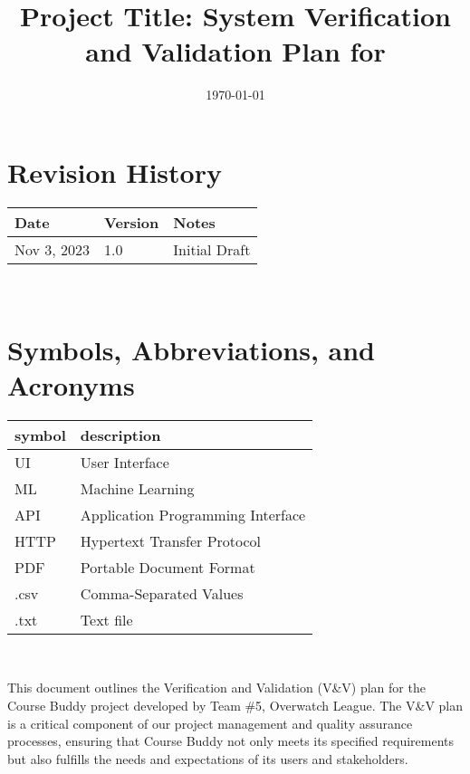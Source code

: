 \documentclass[12pt, titlepage]{article}
\begin{document}
\title{Project Title: System Verification and Validation Plan for \progname{}} 
\author{\authname}
\date{\today}
	
\maketitle


\section*{Revision History}

\begin{tabularx}{\textwidth}{p{3cm}p{2cm}X}
\toprule {\bf Date} & {\bf Version} & {\bf Notes}\\
\midrule
Nov 3, 2023 & 1.0 & Initial Draft\\
\bottomrule
\end{tabularx}

~\\
\newpage

\tableofcontents

\listoftables

\newpage

\section{Symbols, Abbreviations, and Acronyms}

\renewcommand{\arraystretch}{1.2}
\begin{tabular}{l l} 
  \toprule		
  \textbf{symbol} & \textbf{description}\\
  \midrule 
      UI & User Interface \\
      ML & Machine Learning\\
      API & Application Programming Interface\\
      HTTP & Hypertext Transfer Protocol\\
      PDF & Portable Document Format\\
      .csv & Comma-Separated Values \\
      .txt & Text file\\
  \bottomrule
  
\end{tabular}\\


\newpage


This document outlines the Verification and Validation (V\&V) plan for the Course Buddy project developed by Team \#5, Overwatch League. The V\&V plan is a critical component of our project management and quality assurance processes, ensuring that Course Buddy not only meets its specified requirements but also fulfills the needs and expectations of its users and stakeholders.
\end{document}
